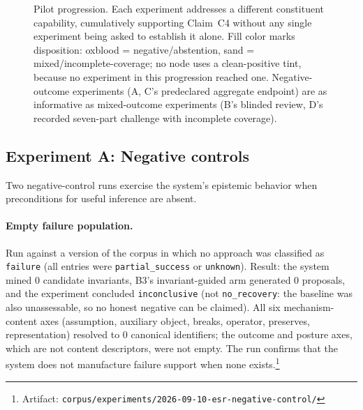 \documentclass[11pt]{article}
\theoremstyle{gowthm}
\theoremstyle{gowplain}
\begin{document}
\begin{figure}[t]
\caption{Pilot progression. Each experiment addresses a different constituent
capability, cumulatively supporting Claim~C4 without any single experiment
being asked to establish it alone. Fill color marks disposition: oxblood =
negative/abstention, sand = mixed/incomplete-coverage; no node uses a
clean-positive tint, because no experiment in this progression reached one.
Negative-outcome experiments (A, C's predeclared aggregate endpoint) are as
informative as mixed-outcome experiments (B's blinded review, D's recorded
seven-part challenge with incomplete coverage).}
\label{fig:progression}
\end{figure}

\subsection{Experiment A: Negative controls}
\label{sec:results-negative}

Two negative-control runs exercise the system's epistemic behavior when
preconditions for useful inference are absent.

\paragraph{Empty failure population.}
Run against a version of the corpus in which no approach was classified as
\texttt{failure} (all entries were \texttt{partial\_success} or \texttt{unknown}).
Result: the system mined 0 candidate invariants, B3's invariant-guided arm
generated 0 proposals, and the experiment concluded \texttt{inconclusive}
(not \texttt{no\_recovery}: the baseline was also unassessable, so no honest
negative can be claimed). All six mechanism-content axes (assumption,
auxiliary object, breaks, operator, preserves, representation) resolved to 0
canonical identifiers; the outcome and posture axes, which are not content
descriptors, were not empty.
The run confirms that the system does not manufacture failure support when none
exists.\footnote{Artifact: \texttt{corpus/experiments/2026-09-10-esr-negative-control/}}
\end{document}

